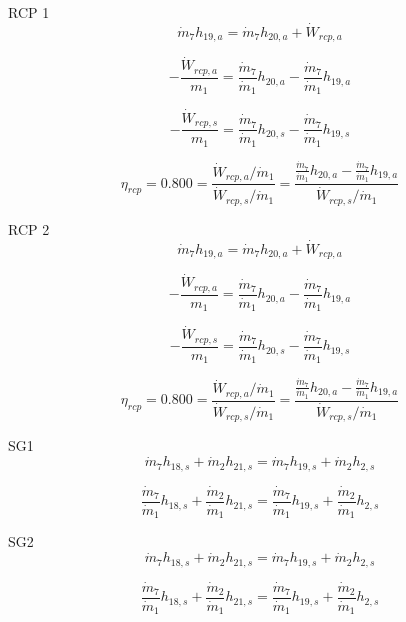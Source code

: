 \documentclass{article}
\begin{document}
RCP 1
\begin{equation}
\dot{m}_{ 7}h_{19,a} = \dot{m}_{ 7}h_{20,a} + \dot{W}_{rcp,a}
\end{equation}

\begin{equation}
-\frac{\dot{W}_{rcp,a}}{m_1} = \frac{\dot{m}_{ 7}}{\dot{m}_{ 1}}h_{20,a} - \frac{\dot{m}_{ 7}}{\dot{m}_{ 1}}h_{19,a}\end{equation}

\begin{equation}
-\frac{\dot{W}_{rcp,s}}{m_1} = \frac{\dot{m}_{ 7}}{\dot{m}_{ 1}}h_{20,s} - \frac{\dot{m}_{ 7}}{\dot{m}_{ 1}}h_{19,s}\end{equation}

\begin{equation}
\eta_{rcp} =    0.800 = \frac{\dot{W}_{rcp,a} / \dot{m}_{1}}{\dot{W}_{rcp,s} / \dot{m}_{1}} = \frac{
\frac{\dot{m}_{ 7}}{\dot{m}_{ 1}}h_{20,a} - \frac{\dot{m}_{ 7}}{\dot{m}_{ 1}}h_{19,a}}{\dot{W}_{rcp,s} / \dot{m}_{1}}
\end{equation}


RCP 2
\begin{equation}
\dot{m}_{ 7}h_{19,a} = \dot{m}_{ 7}h_{20,a} + \dot{W}_{rcp,a}
\end{equation}

\begin{equation}
-\frac{\dot{W}_{rcp,a}}{m_1} = \frac{\dot{m}_{ 7}}{\dot{m}_{ 1}}h_{20,a} - \frac{\dot{m}_{ 7}}{\dot{m}_{ 1}}h_{19,a}\end{equation}

\begin{equation}
-\frac{\dot{W}_{rcp,s}}{m_1} = \frac{\dot{m}_{ 7}}{\dot{m}_{ 1}}h_{20,s} - \frac{\dot{m}_{ 7}}{\dot{m}_{ 1}}h_{19,s}\end{equation}

\begin{equation}
\eta_{rcp} =    0.800 = \frac{\dot{W}_{rcp,a} / \dot{m}_{1}}{\dot{W}_{rcp,s} / \dot{m}_{1}} = \frac{
\frac{\dot{m}_{ 7}}{\dot{m}_{ 1}}h_{20,a} - \frac{\dot{m}_{ 7}}{\dot{m}_{ 1}}h_{19,a}}{\dot{W}_{rcp,s} / \dot{m}_{1}}
\end{equation}


SG1
\begin{equation}
\dot{m}_{ 7}h_{18,s} + \dot{m}_{ 2}h_{21,s} = \dot{m}_{ 7}h_{19,s} + \dot{m}_{ 2}h_{ 2,s}
\end{equation}

\begin{equation}
\frac{\dot{m}_{ 7}}{\dot{m}_{ 1}}h_{18,s} + \frac{\dot{m}_{ 2}}{\dot{m}_{ 1}}h_{21,s} = \frac{\dot{m}_{ 7}}{\dot{m}_{ 1}}h_{19,s} + \frac{\dot{m}_{ 2}}{\dot{m}_{ 1}}h_{ 2,s}
\end{equation}


SG2
\begin{equation}
\dot{m}_{ 7}h_{18,s} + \dot{m}_{ 2}h_{21,s} = \dot{m}_{ 7}h_{19,s} + \dot{m}_{ 2}h_{ 2,s}
\end{equation}

\begin{equation}
\frac{\dot{m}_{ 7}}{\dot{m}_{ 1}}h_{18,s} + \frac{\dot{m}_{ 2}}{\dot{m}_{ 1}}h_{21,s} = \frac{\dot{m}_{ 7}}{\dot{m}_{ 1}}h_{19,s} + \frac{\dot{m}_{ 2}}{\dot{m}_{ 1}}h_{ 2,s}
\end{equation}
\end{document}
